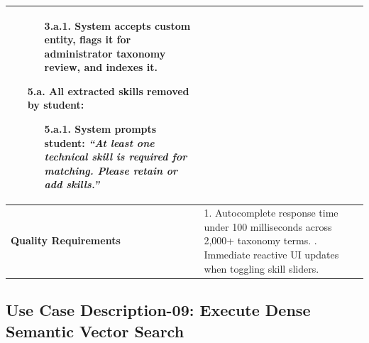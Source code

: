 \begin{table}[H]
\begin{tabularx}{\textwidth}{|l|X|}
\begin{itemize}[leftmargin=*]
    \begin{itemize}[leftmargin=*]
        \item[3.a.1.] System accepts custom entity, flags it for administrator taxonomy review, and indexes it.
    \end{itemize}
    \item[\textbf{5.a.}] \textbf{All extracted skills removed by student:}
    \begin{itemize}[leftmargin=*]
        \item[5.a.1.] System prompts student: \textit{``At least one technical skill is required for matching. Please retain or add skills.''}
    \end{itemize}
\end{itemize} \\ \hline
\textbf{Quality Requirements} & 
1. Autocomplete response time under 100 milliseconds across 2,000+ taxonomy terms. \newline
2. Immediate reactive UI updates when toggling skill sliders. \\ \hline
\end{tabularx}
\end{table}

\clearpage
\subsection{Use Case Description-09: Execute Dense Semantic Vector Search}
\label{subsec:uc09}

